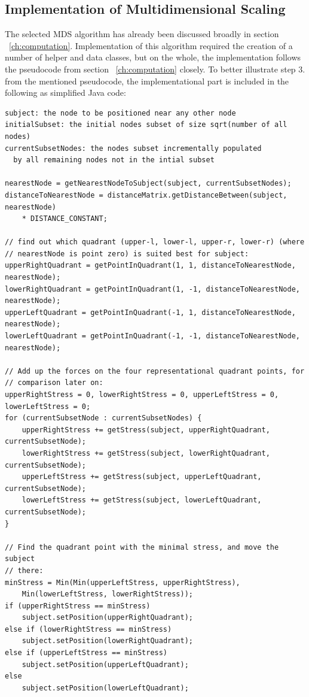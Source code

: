 \subsection{Implementation of Multidimensional Scaling}
\label{subch:implementation-mds}

The selected MDS algorithm has already been discussed broadly in section ~\ref{ch:computation}. Implementation of this algorithm required the creation of a number of helper and data classes, but on the whole, the implementation follows the pseudocode from section ~\ref{ch:computation} closely. To better illustrate step 3. from the mentioned pseudocode, the implementational part is included in the following as simplified Java code:

\begin{verbatim}
subject: the node to be positioned near any other node
initialSubset: the initial nodes subset of size sqrt(number of all nodes)
currentSubsetNodes: the nodes subset incrementally populated 
  by all remaining nodes not in the intial subset

nearestNode = getNearestNodeToSubject(subject, currentSubsetNodes);
distanceToNearestNode = distanceMatrix.getDistanceBetween(subject, nearestNode)
    * DISTANCE_CONSTANT;

// find out which quadrant (upper-l, lower-l, upper-r, lower-r) (where
// nearestNode is point zero) is suited best for subject:
upperRightQuadrant = getPointInQuadrant(1, 1, distanceToNearestNode, nearestNode);
lowerRightQuadrant = getPointInQuadrant(1, -1, distanceToNearestNode, nearestNode);
upperLeftQuadrant = getPointInQuadrant(-1, 1, distanceToNearestNode, nearestNode);
lowerLeftQuadrant = getPointInQuadrant(-1, -1, distanceToNearestNode, nearestNode);

// Add up the forces on the four representational quadrant points, for
// comparison later on:
upperRightStress = 0, lowerRightStress = 0, upperLeftStress = 0, lowerLeftStress = 0;
for (currentSubsetNode : currentSubsetNodes) {
    upperRightStress += getStress(subject, upperRightQuadrant, currentSubsetNode);
    lowerRightStress += getStress(subject, lowerRightQuadrant, currentSubsetNode);
    upperLeftStress += getStress(subject, upperLeftQuadrant, currentSubsetNode);
    lowerLeftStress += getStress(subject, lowerLeftQuadrant, currentSubsetNode);
}

// Find the quadrant point with the minimal stress, and move the subject
// there:
minStress = Min(Min(upperLeftStress, upperRightStress),
    Min(lowerLeftStress, lowerRightStress));
if (upperRightStress == minStress)
    subject.setPosition(upperRightQuadrant);
else if (lowerRightStress == minStress)
    subject.setPosition(lowerRightQuadrant);
else if (upperLeftStress == minStress)
    subject.setPosition(upperLeftQuadrant);
else
    subject.setPosition(lowerLeftQuadrant);


\end{verbatim}
